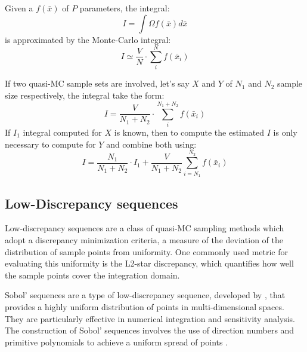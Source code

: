 \documentclass[12pt]{extarticle}
\begin{document}
Given a $f(\bar{x})$ of $P$ parameters, the integral:
\begin{equation*}
I = \int{\Omega}f(\bar{x})d\bar{x}
\end{equation*}
is approximated by the Monte-Carlo integral:
\begin{equation*}
I \simeq \frac{V}{N} \cdot \sum^N_i{f(\bar{x}_i)}
\end{equation*}

If two quasi-MC sample sets are involved, let's say $X$ and $Y$ of $N_1$ and $N_2$ sample size respectively, the integral take the form:
\begin{equation*}
I = \frac{V}{N_1 + N_2} \cdot \sum^{N_1 + N_2}_i{f(\bar{x}_i)}
\end{equation*}
If $I_1$ integral computed for $X$ is known, then to compute the estimated $I$ is only necessary to compute for $Y$ and combine both using:
\begin{equation}
\label{eq:mc_next_step}
I = \frac{N_1}{N_1 + N_2} \cdot I_1 + \frac{V}{N_1 + N_2}\sum^{N_2}_{i=N_1}{f(\bar{x}_i)}
\end{equation}

\subsection{Low-Discrepancy sequences}
\label{appendix:low_discrepancy}
Low-discrepancy sequences are a class of quasi-MC sampling methods which adopt a discrepancy minimization criteria, a measure of the deviation of the distribution of sample points from uniformity. One commonly used metric for evaluating this uniformity is the L2-star discrepancy, which quantifies how well the sample points cover the integration domain.

Sobol’ sequences are a type of low-discrepancy sequence, developed by , that provides a highly uniform distribution of points in multi-dimensional spaces. They are particularly effective in numerical integration and sensitivity analysis. The construction of Sobol’ sequences involves the use of direction numbers and primitive polynomials to achieve a uniform spread of points . 

\pagebreak
\printbibliography
\end{document}
